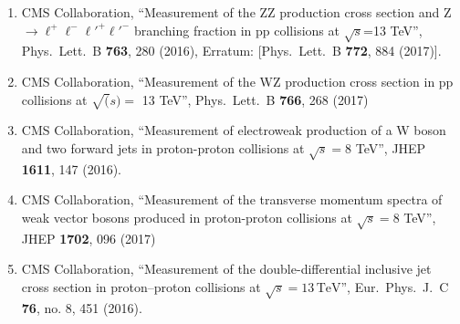 \begin{enumerate}
\item CMS Collaboration, ``Measurement of the ZZ production cross section and Z $\to \ell^+\ell^-\ell'^+\ell'^-$ branching fraction in pp collisions at $\sqrt s$=13 TeV'', Phys.\ Lett.\ B {\bf 763}, 280 (2016), Erratum: [Phys.\ Lett.\ B {\bf 772}, 884 (2017)].

\item CMS Collaboration, ``Measurement of the WZ production cross section in pp collisions at $\sqrt(s) =$ 13 TeV'', Phys.\ Lett.\ B {\bf 766}, 268 (2017)

\item CMS Collaboration, ``Measurement of electroweak production of a W boson and two forward jets in proton-proton collisions at $ \sqrt{s}=8 $ TeV'', JHEP {\bf 1611}, 147 (2016).

\item CMS Collaboration, ``Measurement of the transverse momentum spectra of weak vector bosons produced in proton-proton collisions at $ \sqrt{s}=8 $ TeV'', JHEP {\bf 1702}, 096 (2017)

\item CMS Collaboration, ``Measurement of the double-differential inclusive jet cross section in proton–proton collisions at $\sqrt{s} = 13\,\text {TeV} $'', Eur.\ Phys.\ J.\ C {\bf 76}, no. 8, 451 (2016).


\end{enumerate}
